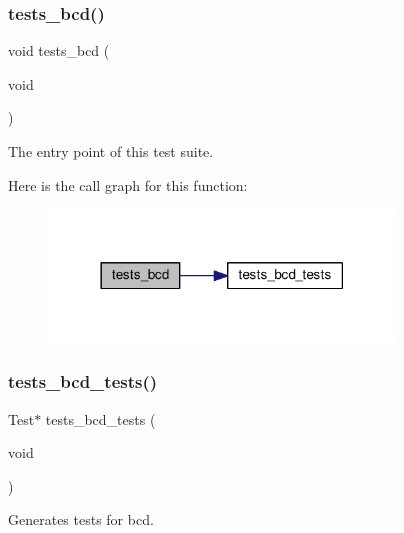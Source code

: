 \subsubsection{\texorpdfstring{tests\+\_\+bcd()}{tests\_bcd()}}
{\footnotesize\ttfamily void tests\+\_\+bcd (\begin{DoxyParamCaption}\item[{void}]{ }\end{DoxyParamCaption})}



The entry point of this test suite. 

Here is the call graph for this function\+:
\nopagebreak
\begin{figure}[H]
\begin{center}
\leavevmode
\includegraphics[width=261pt]{group__unittests_ga743f1615d5742924d9f921a17fe159a6_cgraph}
\end{center}
\end{figure}
\mbox{\label{group__unittests_ga67d8fcec140a78689e78a00ba4b2582e}} 
\subsubsection{\texorpdfstring{tests\+\_\+bcd\+\_\+tests()}{tests\_bcd\_tests()}}
{\footnotesize\ttfamily Test$\ast$ tests\+\_\+bcd\+\_\+tests (\begin{DoxyParamCaption}\item[{void}]{ }\end{DoxyParamCaption})}



Generates tests for bcd. 

